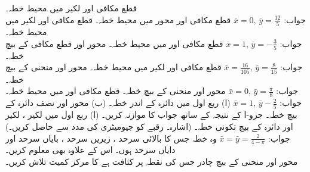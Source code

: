 قطع مکافی  اور لکیر  میں محیط خطہ۔\\
جواب:\quad
$\bar{x}=0,\,\bar{y}=\tfrac{12}{5}$
قطع مکافی  اور محور  میں محیط خطہ۔
قطع مکافی  اور لکیر  میں محیط خطہ۔\\
جواب:\quad
$\bar{x}=1,\,\bar{y}=-\tfrac{3}{5}$
قطع مکافی  اور   میں محیط خطہ۔
محور  اور قطع مکافی  کے بیچ خطہ۔\\
جواب:\quad
$\bar{x}=\tfrac{16}{105},\,\bar{y}=\tfrac{8}{15}$
قطع مکافی  اور لکیر  میں محیط خطہ۔
محور  اور منحنی  کے بیچ خطہ۔\\
جواب:\quad
$\bar{x}=0,\,\bar{y}=\tfrac{\pi}{8}$
محور  اور منحنی  کے بیچ خطہ۔
قطع مکافی  اور   میں محیط خطہ۔\\
جواب:\quad
$\bar{x}=1,\,\bar{y}-\tfrac{2}{5}$
(ا) ربع اول میں دائرہ  کے اندر خطہ۔ (ب) محور  اور نصف دائرہ  کے بیچ خطہ۔ جزو-ا کے نتیجہ کے ساتھ جواب کا موازنہ کریں۔
(ا) ربع اول میں لکیر ، لکیر  اور دائرہ  کے بیچ تکونی خطہ۔ (اشارہ۔ رقبے کو جیومیٹری کی مدد سے حاصل کریں۔)\\
جواب:\quad
$\bar{x}=\bar{y}=\tfrac{2}{4-\pi}$
وہ خطہ جس کا بالائی سرحد ، زیریں سرحد ، بایاں سرحد  اور دایاں سرحد  ہوں۔ اس کے علاوہ  بھی معلوم کریں۔
\\
محور اور منحنی  کے بیچ چادر جس کی  نقطہ  پر کثافت  ہے کا مرکز کمیت تلاش کریں۔\\

